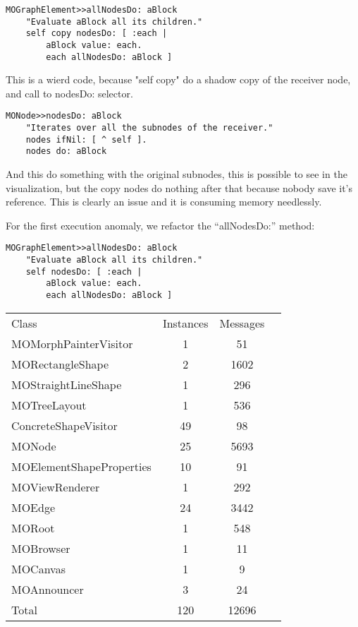 \documentclass{sig-alternate}
\begin{document}
\begin{lstlisting}[language=Smalltalk]
MOGraphElement>>allNodesDo: aBlock
	"Evaluate aBlock all its children."
	self copy nodesDo: [ :each |
		aBlock value: each.
		each allNodesDo: aBlock ]
\end{lstlisting} 

This is a wierd code, because "self copy" do a shadow copy of the receiver node, and call to nodesDo: selector.

\begin{lstlisting}[language=Smalltalk]
MONode>>nodesDo: aBlock
	"Iterates over all the subnodes of the receiver."	
	nodes ifNil: [ ^ self ].
	nodes do: aBlock
\end{lstlisting} 

And this do something with the original subnodes, this is possible to see in the visualization, but the copy nodes do nothing after that because nobody save it's reference. This is clearly an issue  and it is consuming memory needlessly.

For the first execution anomaly, we refactor the ``allNodesDo:'' method: 
\begin{lstlisting}[language=Smalltalk]
MOGraphElement>>allNodesDo: aBlock
	"Evaluate aBlock all its children."
	self nodesDo: [ :each |
		aBlock value: each.
		each allNodesDo: aBlock ]
\end{lstlisting} 

\begin{center}
   \begin{tabular}{|l||ccr|} \hline
	Class & Instances & Messages \\
	MOMorphPainterVisitor & 1 & 51	\\
	MORectangleShape & 2 & 1602	\\
	MOStraightLineShape & 1 & 296	\\
	MOTreeLayout & 1 & 536	\\
	ConcreteShapeVisitor & 49 & 98 \\
	MONode & 25 & 5693\\
	MOElementShapeProperties & 10 & 91\\
	MOViewRenderer & 1 & 292\\
	MOEdge & 24 & 3442\\
	MORoot & 1 & 548\\
	MOBrowser & 1 & 11\\
	MOCanvas & 1 & 9\\
	MOAnnouncer & 3 & 24\\
	Total & 120 & 12696 \\
   \end{tabular}
\end{center}
\end{document}
